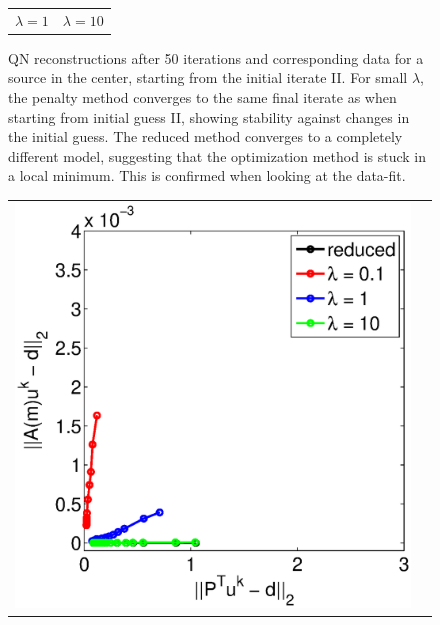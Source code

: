 \documentclass{iopart}
\begin{document}
{\begin{figure}
\begin{tabular}{cc}
{\small $\lambda=1$}&
{\small $\lambda=10$}\\
\end{tabular}
\caption{QN reconstructions after 50 iterations and corresponding data for a source in the center, starting from the initial iterate II. For small $\lambda$, the penalty method converges to the same final iterate as when starting from initial guess II, showing stability against changes in the initial guess. The reduced method converges to a completely different model, suggesting that the optimization method is stuck in a local minimum. This is confirmed when looking at the data-fit.}
\label{fig:2D_overthrust2}
\end{figure}

\begin{figure}
\centering
\begin{tabular}{cc}
\includegraphics[scale=.3]{./figs/2D_overthrust1_e}&

\end{tabular}
\end{figure}}
\end{document}
